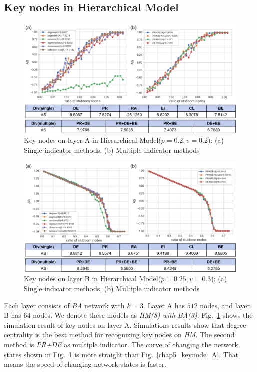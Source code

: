 \subsection{Key nodes in Hierarchical Model}
\begin{figure}[!htb]
	\centering
	\includegraphics[width=\hsize]{figure/chap5_keynode_HM_A.png}
	\caption{Key nodes on layer A in Hierarchical Model($p=0.2, v=0.2$):
		(a) Single indicator methods, (b) Multiple indicator methods}
	\label{chap5_keynode_HM_A}
\end{figure}
\begin{figure}[!htb]
	\centering
	\includegraphics[width=\hsize]{figure/chap5_keynode_HM_B.png}
	\caption{Key nodes on layer B in Hierarchical Model($p=0.25, v=0.3$):
		(a) Single indicator methods, (b) Multiple indicator methods}
	\label{chap5_keynode_HM_B}
\end{figure}
Each layer consists of \textit{BA} network with $k=3$. Layer A has $512$ nodes, and layer B has $64$ nodes. We denote these models as \textit{HM(8) with BA(3)}.
Fig.~\ref{chap5_keynode_HM_A} shows the simulation result of key nodes on layer A. 
Simulations results show that degree centrality is the best method for recognizing key nodes on \textit{HM}. The second method is \textit{PR+DE} as multiple indicator. The curve of changing the network states shown in Fig.~\ref{chap5_keynode_HM_A} is more straight than Fig.~\ref{chap5_keynode_A}. That means the speed of changing network states is faster. 
